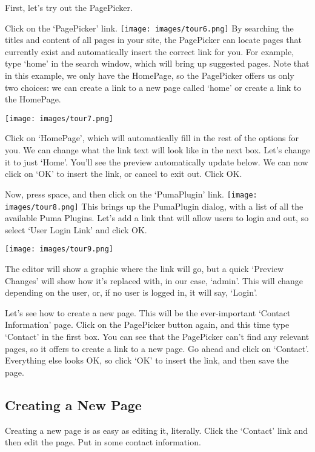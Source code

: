 \documentclass[12pt]{article}
\begin{document}
First, let's try out the PagePicker.

Click on the `PagePicker' link. \texttt{[image: images/tour6.png]}  By searching the titles and content of all pages in your site, the PagePicker can locate pages that currently exist and automatically insert the correct link for you. For example, type `home' in the search window, which will bring up suggested pages. Note that in this example, we only have the HomePage, so the PagePicker offers us only two choices: we can create a link to a new page called `home' or create a link to the HomePage.

\texttt{[image: images/tour7.png]} 

Click on `HomePage', which will automatically fill in the rest of the options for you. We can change what the link text will look like in the next box. Let's change it to just `Home'. You'll see the preview automatically update below. We can now click on `OK' to insert the link, or cancel to exit out. Click OK.

Now, press space, and then click on the `PumaPlugin' link. \texttt{[image: images/tour8.png]}  This brings up the PumaPlugin dialog, with a list of all the available Puma Plugins. Let's add a link that will allow users to login and out, so select `User Login Link' and click OK.

\texttt{[image: images/tour9.png]} 

The editor will show a graphic where the link will go, but a quick `Preview Changes' will show how it's replaced with, in our case, `admin'. This will change depending on the user, or, if no user is logged in, it will say, `Login'.

Let's see how to create a new page. This will be the ever-important `Contact Information' page. Click on the PagePicker button again, and this time type `Contact' in the first box. You can see that the PagePicker can't find any relevant pages, so it offers to create a link to a new page. Go ahead and click on `Contact'. Everything else looks OK, so click `OK' to insert the link, and then save the page.

\subsection*{Creating a New Page}

Creating a new page is as easy as editing it, literally. Click the `Contact' link and then edit the page. Put in some contact information.
\end{document}
